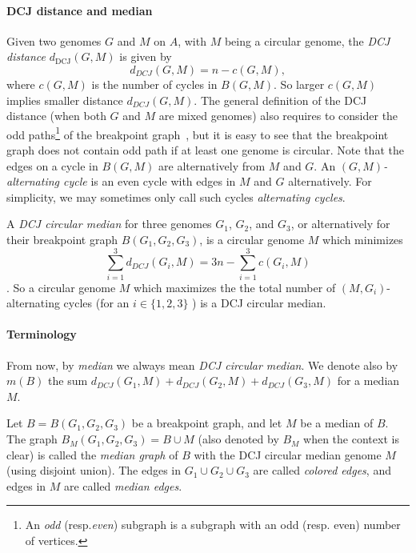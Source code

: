 \documentclass[10pt]{llncs}
\begin{document}
\paragraph{DCJ distance and median}
Given two genomes $G$ and $M$ on $A$, with $M$ being a circular
genome, the {\em DCJ distance} $d_{\text{DCJ}}(G,M)$ is given by
\begin{equation}\label{distancefunc}
d_{DCJ}(G, M) = n - c(G, M),
\end{equation}
where $c(G,M)$ is the number of cycles in $B(G,M)$. So larger $c(G,
M)$ implies smaller distance $d_{DCJ}(G, M)$. The general definition
of the DCJ distance (when both $G$ and $M$ are mixed genomes) also
requires to consider the odd paths\footnote{ An \emph{odd}
  (resp.\emph{even}) subgraph is a subgraph with an odd (resp. even)
  number of vertices.} of the breakpoint graph~\cite{Bergeron2006},
but it is easy to see that the breakpoint graph does not contain odd
path if at least one genome is circular. Note that the edges on a
cycle in $B(G, M)$ are alternatively from $M$ and $G$. An \emph{$(G,
  M)$-alternating cycle} is an even cycle with edges in $M$ and $G$
alternatively. For simplicity, we may sometimes only call such cycles
\emph{alternating cycles}.

A {\em DCJ circular median} for three genomes $G_1$, $G_2$, and $G_3$,
or alternatively for their breakpoint graph $B(G_1,G_2,G_3)$, is a
circular genome $M$ which minimizes 
$$\sum\limits_{i = 1}^{3}d_{DCJ}(G_i, M)=3n-\sum\limits_{i =
  1}^{3}c(G_i, M)$$. So a circular genome $M$ which maximizes the the
total number of $(M, G_i)$-alternating cycles (for an $i \in \{1, 2,
3\}$ ) is a DCJ circular median.

\paragraph{Terminology}
From now, by \emph{median} we always mean \emph{DCJ circular median}.
We denote also by $m(B)$ the sum $d_{DCJ}(G_1, M)+d_{DCJ}(G_2,
M)+d_{DCJ}(G_3, M)$ for a median $M$.

Let $B = B(G_1, G_2, G_3)$ be a breakpoint graph, and let $M$ be a
median of $B$.  The graph $B_M(G_1, G_2, G_3)=B \cup M$ (also denoted
by $B_M$ when the context is clear) is called the \emph{median graph}
of $B$ with the DCJ circular median genome $M$ (using disjoint union).
The edges in $G_1 \cup G_2 \cup G_3$ are called {\em colored
  edges}, and edges in $M$ are called {\em median
  edges}. 
\end{document}
